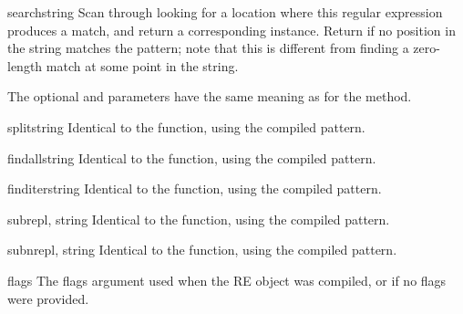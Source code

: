 \begin{methoddesc}[RegexObject]{search}{string}
  Scan through  looking for a location where this regular
  expression produces a match, and return a
  corresponding  instance.  Return  if no
  position in the string matches the pattern; note that this is
  different from finding a zero-length match at some point in the string.

  The optional  and  parameters have the same
  meaning as for the  method.
\end{methoddesc}

\begin{methoddesc}[RegexObject]{split}{string}
Identical to the  function, using the compiled pattern.
\end{methoddesc}

\begin{methoddesc}[RegexObject]{findall}{string}
Identical to the  function, using the compiled pattern.
\end{methoddesc}

\begin{methoddesc}[RegexObject]{finditer}{string}
Identical to the  function, using the compiled pattern.
\end{methoddesc}

\begin{methoddesc}[RegexObject]{sub}{repl, string}
Identical to the  function, using the compiled pattern.
\end{methoddesc}

\begin{methoddesc}[RegexObject]{subn}{repl, string}
Identical to the  function, using the compiled pattern.
\end{methoddesc}


\begin{memberdesc}[RegexObject]{flags}
The flags argument used when the RE object was compiled, or
 if no flags were provided.
\end{memberdesc}

